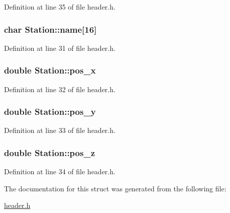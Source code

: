Definition at line 35 of file header.h.\hypertarget{structStation_ac8127951b98999b3113aef2848eac303}{
\subsubsection[{name}]{\setlength{\rightskip}{0pt plus 5cm}char {\bf Station::name}\mbox{[}16\mbox{]}}}
\label{structStation_ac8127951b98999b3113aef2848eac303}


Definition at line 31 of file header.h.\hypertarget{structStation_a2a40a030fb955c58f85087a862001a2b}{
\subsubsection[{pos\_\-x}]{\setlength{\rightskip}{0pt plus 5cm}double {\bf Station::pos\_\-x}}}
\label{structStation_a2a40a030fb955c58f85087a862001a2b}


Definition at line 32 of file header.h.\hypertarget{structStation_a26b9715099d26217b63e13888094d99e}{
\subsubsection[{pos\_\-y}]{\setlength{\rightskip}{0pt plus 5cm}double {\bf Station::pos\_\-y}}}
\label{structStation_a26b9715099d26217b63e13888094d99e}


Definition at line 33 of file header.h.\hypertarget{structStation_aa14c4cd7ad155ca7107fa9c329e4c963}{
\subsubsection[{pos\_\-z}]{\setlength{\rightskip}{0pt plus 5cm}double {\bf Station::pos\_\-z}}}
\label{structStation_aa14c4cd7ad155ca7107fa9c329e4c963}


Definition at line 34 of file header.h.

The documentation for this struct was generated from the following file:\begin{DoxyCompactItemize}
\item 
\hyperlink{header_8h}{header.h}\end{DoxyCompactItemize}
